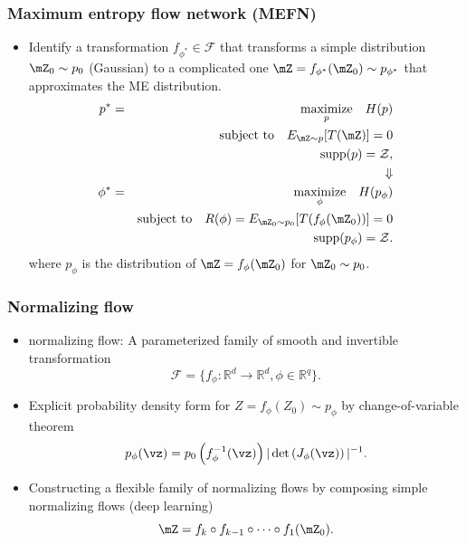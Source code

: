 \documentclass[16pt,presentation]{beamer}
\begin{document}
\begin{frame}
\frametitle{Maximum entropy flow network (MEFN)}
\begin{itemize}
\item Identify a transformation $f_{\phi^*} \in \mathcal{F}$ that transforms a simple distribution $\mZ_0 \sim p_0$ (Gaussian) to a complicated one $\mZ = f_{\phi^*}(\mZ_0) \sim p_{\phi^*}$ that approximates the ME distribution.
\begin{eqnarray*}
p^{*} &=& \underset{p}{\text{maximize}}~~~ H(p) \\
&& \text{subject to} ~~~E_{\mZ\sim p}[T(\mZ)]=0 \nonumber\\
&& ~~~~~~~~~~~~~~~~~~\supp(p)=\mathcal{Z} \nonumber,\\
&&~~~~~~~~\Downarrow\\
\phi^{*} &=& \underset{\phi}{\text{maximize}}~~~ H(p_\phi) \\
&& \text{subject to} ~~~R(\phi) = E_{\mZ_0\sim p_0}[T(f_\phi(\mZ_{0}))]=0 \nonumber\\
&& ~~~~~~~~~~~~~~~~~~\supp(p_\phi)=\mathcal{Z}. \nonumber
\end{eqnarray*}
where $p_\phi$ is the distribution of $\mZ = f_\phi(\mZ_0)$ for $\mZ_0 \sim p_0$.
\end{itemize}
\end{frame}


\begin{frame}
\frametitle{Normalizing flow}
\begin{itemize}
\item \alert{normalizing flow}: A parameterized family of smooth and invertible transformation \[\mathcal{F}=\{f_\phi:  \mathbb{R}^d \rightarrow \mathbb{R}^d, \phi \in \mathbb{R}^q\}.\]
\item Explicit probability density form for $Z = f_\phi(Z_0) \sim p_\phi$ by \alert{change-of-variable theorem}
\[p_\phi(\vz) = p_0\left( f_\phi^{-1}(\vz) \right) | \det \left(J_\phi (\vz)\right) |^{-1}.\]
\item Constructing a flexible family of normalizing flows by composing simple normalizing flows (\alert{deep learning})
\[\mZ = f_{k}\circ f_{k-1}\circ\dots \circ f_{1}(\mZ_{0}).\]
\end{itemize}
\end{frame}
\end{document}
